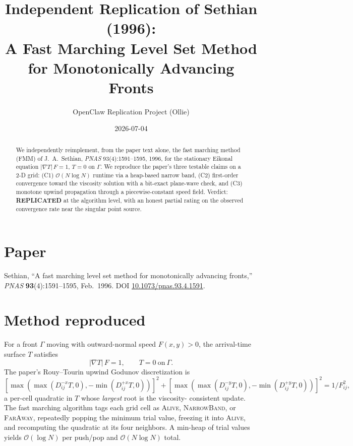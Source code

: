 \documentclass[11pt]{article}
\title{Independent Replication of Sethian (1996):\\
A Fast Marching Level Set Method for Monotonically Advancing Fronts}
\author{OpenClaw Replication Project (Ollie)}
\date{2026-07-04}
\begin{document}
\maketitle

\begin{abstract}
We independently reimplement, from the paper text alone, the fast marching
method (FMM) of J.\ A.\ Sethian, \emph{PNAS} 93(4):1591--1595, 1996, for the
stationary Eikonal equation $|\nabla T|\,F=1$, $T=0$ on $\Gamma$. We reproduce
the paper's three testable claims on a 2-D grid: (C1) $\mathcal{O}(N\log N)$
runtime via a heap-based narrow band, (C2) first-order convergence toward the
viscosity solution with a bit-exact plane-wave check, and (C3) monotone upwind
propagation through a piecewise-constant speed field. Verdict:
\textbf{REPLICATED} at the algorithm level, with an honest partial rating on
the observed convergence rate near the singular point source.
\end{abstract}

\section{Paper}
Sethian, ``A fast marching level set method for monotonically advancing
fronts,'' \emph{PNAS} \textbf{93}(4):1591--1595, Feb.\ 1996.
DOI \href{https://doi.org/10.1073/pnas.93.4.1591}{10.1073/pnas.93.4.1591}.

\section{Method reproduced}
For a front $\Gamma$ moving with outward-normal speed $F(x,y)>0$, the
arrival-time surface $T$ satisfies
\[
   |\nabla T|\, F = 1,\qquad T=0\ \text{on}\ \Gamma.
\]
The paper's Rouy--Tourin upwind Godunov discretization is
\[
[\max(\max(D^{-x}_{ij}T,0),-\min(D^{+x}_{ij}T,0))]^2
+[\max(\max(D^{-y}_{ij}T,0),-\min(D^{+y}_{ij}T,0))]^2 = 1/F_{ij}^2,
\]
a per-cell quadratic in $T$ whose \emph{largest} root is the viscosity-
consistent update. The fast marching algorithm tags each grid cell as
\textsc{Alive}, \textsc{NarrowBand}, or \textsc{FarAway}, repeatedly popping
the minimum trial value, freezing it into \textsc{Alive}, and recomputing the
quadratic at its four neighbors. A min-heap of trial values yields
$\mathcal{O}(\log N)$ per push/pop and $\mathcal{O}(N\log N)$ total.
\end{document}
